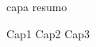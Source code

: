 \documentclass[a4paper,11pt]{abnt}
\begin{document}
 {capa}
 {resumo}
\tableofcontents
\listoffigures

 {Cap1}
 {Cap2}
 {Cap3}
\end{document}
